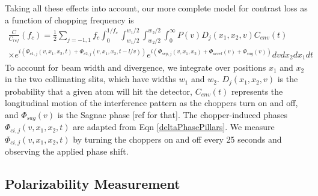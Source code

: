 \documentclass[twocolumn, prl,showpacs,superscriptaddress]{revtex4-1}   %
\newcommand{\eqnref}[1]{Eqn \ref{#1}}
\begin{document}
Taking all these effects into account, our more complete model for contrast loss as a function of chopping frequency is
\begin{align}
	\frac{C}{C_{ref}}(f_c) = 
		\frac{1}{2} \sum_{j=-1,1}
		f_c \int_0^{1/f_c} 
		\int_{w_1/2}^{w_1/2}
		\int_{w_2/2}^{w_2/2}
		\int_0^{\infty} 
		P(v)
		D_j(x_1, x_2, v)
		C_{env}(t)                   
		\nonumber \\ \times
		e^{i( \Phi_{c1,j}(v,x_1,x_2,t) + \Phi_{c2,j}(v,x_1,x_2,t-l/v) )}
		e^{i( \Phi_{sep,j}(v,x_1,x_2) + \Phi_{accel}(v) + \Phi_{sag}(v) )}
		dv dx_{2} dx_{1} dt	
	\label{CvCF}
\end{align}
To account for beam width and divergence, we integrate over positions $x_1$ and $x_2$ in the two collimating slits, which have widths $w_1$ and $w_2$. $D_j(x_1, x_2, v)$ is the probability that a given atom will hit the detector, $C_{env}(t)$ represents the longitudinal motion of the interference pattern as the choppers turn on and off, and $\Phi_{sag}(v)$ is the Sagnac phase [ref for that]. The chopper-induced phases $\Phi_{ci,j}(v,x_1,x_2,t)$ are adapted from \eqnref{deltaPhasePillars}. %
We measure $\Phi_{ci,j}(v,x_1,x_2,t)$ by turning the choppers on and off every 25 seconds and observing the applied phase shift.

\subsection{Polarizability Measurement}
\end{document}
